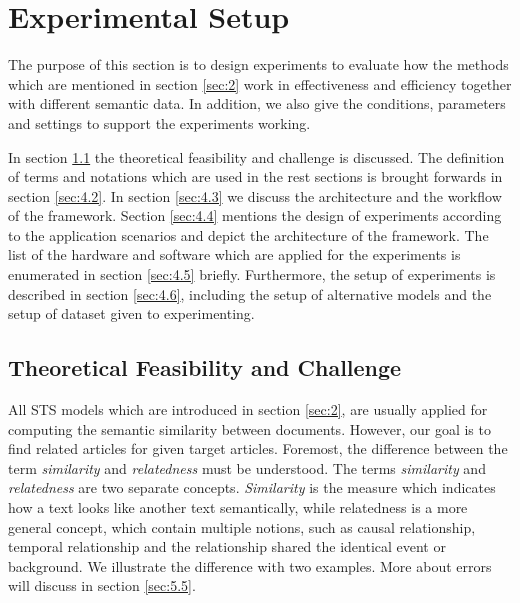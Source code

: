 \section{Experimental Setup}
\label{sec:4}

The purpose of this section is to design experiments to evaluate how the methods which are mentioned in section \ref{sec:2} work in effectiveness and efficiency together with different semantic data. In addition, we also give the conditions, parameters and settings to support the experiments working. 

In section \ref{sec:4.1} the theoretical feasibility and challenge is discussed. The definition of terms and notations which are used in the rest sections is brought forwards in section \ref{sec:4.2}. In section \ref{sec:4.3} we discuss the architecture and the workflow of the framework. Section \ref{sec:4.4} mentions the design of experiments according to the application scenarios and depict the architecture of the framework. The list of the hardware and software which are applied for the experiments is enumerated in section \ref{sec:4.5} briefly. Furthermore, the setup of experiments is described in section \ref{sec:4.6}, including the setup of alternative models and the setup of dataset given to experimenting.

\subsection{Theoretical Feasibility and Challenge}
\label{sec:4.1}

All STS models which are introduced in section \ref{sec:2}, are usually applied for computing the semantic similarity between documents. However, our goal is to find related articles for given target articles. Foremost, the difference between the term \textit{similarity} and \textit{relatedness} must be understood. The terms \textit{similarity} and \textit{relatedness} are two separate concepts\cite{pedersen2007measures}. \textit{Similarity} is the measure which indicates how a text looks like another text semantically, while relatedness is a more general concept, which contain multiple notions, such as causal relationship, temporal relationship and the relationship shared the identical event or background. We illustrate the difference with two examples. More about errors will discuss in section \ref{sec:5.5}. 

